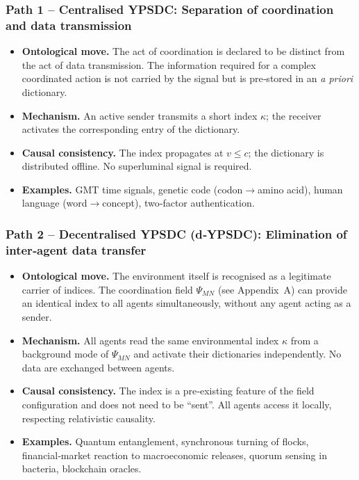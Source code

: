 \documentclass[12pt,a4paper]{article}
\begin{document}
\subsubsection*{Path 1 – Centralised YPSDC: Separation of coordination and data transmission}
\begin{itemize}[leftmargin=*]
	\item \textbf{Ontological move.} The act of coordination is declared to be
	distinct from the act of data transmission. The information required for a
	complex coordinated action is not carried by the signal but is pre‑stored
	in an \emph{a priori} dictionary.
	\item \textbf{Mechanism.} An active sender transmits a short index
	\(\kappa\); the receiver activates the corresponding entry of the
	dictionary.
	\item \textbf{Causal consistency.} The index propagates at \(v \le c\);
	the dictionary is distributed offline. No superluminal signal is required.
	\item \textbf{Examples.} GMT time signals, genetic code (codon$\to$amino
	acid), human language (word$\to$concept), two‑factor authentication.
\end{itemize}

\subsubsection*{Path 2 – Decentralised YPSDC (d‑YPSDC): Elimination of inter‑agent data transfer}
\begin{itemize}[leftmargin=*]
	\item \textbf{Ontological move.} The environment itself is recognised as a
	legitimate carrier of indices. The coordination field \(\Psi_{MN}\) (see
	Appendix~A) can provide an identical index to all agents simultaneously,
	without any agent acting as a sender.
	\item \textbf{Mechanism.} All agents read the same environmental index
	\(\kappa\) from a background mode of \(\Psi_{MN}\) and activate their
	dictionaries independently. No data are exchanged between agents.
	\item \textbf{Causal consistency.} The index is a pre‑existing feature of
	the field configuration and does not need to be ``sent''. All agents access
	it locally, respecting relativistic causality.
	\item \textbf{Examples.} Quantum entanglement, synchronous turning of
	flocks, financial‑market reaction to macroeconomic releases, quorum
	sensing in bacteria, blockchain oracles.
\end{itemize}
\end{document}

